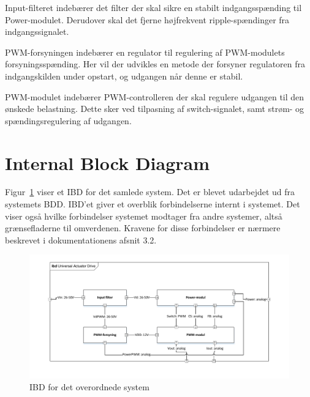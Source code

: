 Input-filteret indebærer det filter der skal sikre en stabilt indgangsspænding til Power-modulet. Derudover skal det fjerne højfrekvent ripple-spændinger fra indgangssignalet. 

PWM-forsyningen indebærer en regulator til regulering af PWM-modulets forsyningsspænding. Her vil der udvikles en metode der forsyner regulatoren fra indgangskilden under opstart, og udgangen når denne er stabil.

PWM-modulet indebærer PWM-controlleren der skal regulere udgangen til den ønskede belastning. Dette sker ved tilpasning af switch-signalet, samt strøm- og spændingsregulering af udgangen.

\section{Internal Block Diagram}
Figur~\ref{fig:IBD} viser et IBD for det samlede system. Det er blevet udarbejdet ud fra systemets BDD. IBD'et giver et overblik forbindelserne internt i systemet. Det viser også hvilke forbindelser systemet modtager fra andre systemer, altså grænsefladerne til omverdenen. Kravene for disse forbindelser er nærmere beskrevet i dokumentationens afsnit 3.2.

\begin{figure}[H]
	\centering
	\includegraphics[width=1\linewidth]{../Dokumentation/tex/systemarkitektur/billeder/IBD.pdf}
	\caption{IBD for det overordnede system}
	\label{fig:IBD}
\end{figure}